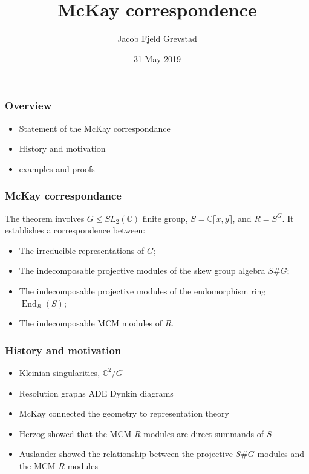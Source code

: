 \documentclass[screen, aspectratio=43]{beamer}
\title{McKay correspondence}
\author[J. F. Grevstad]{Jacob Fjeld Grevstad}
\institute[NTNU]{Department of Mathematical sciences, NTNU}
\date{31 May 2019}
\theoremstyle{definition}
\newcommand{\C}{\mathbb{C}}
\DeclareMathOperator{\End}{End}
\begin{document}
\begin{frame}
  \titlepage
\end{frame}


\begin{frame}
	\frametitle{Overview}
	\begin{itemize}
		\item Statement of the McKay correspondance
		\item History and motivation
		\item examples and proofs
	\end{itemize}
\end{frame}

\begin{frame}
	\frametitle{McKay correspondance}
	The theorem involves $G \leq SL_2(\C)$ finite group, $S= \C \llbracket x, y \rrbracket$, and $R = S^G$. It establishes a correspondence between:
	\begin{itemize}
		\item The irreducible representations of $G$; 
		\item The indecomposable projective modules of the skew group algebra $S\#G$;
		\item The indecomposable projective modules of the endomorphism ring $\End_R(S)$;
		\item The indecomposable MCM modules of $R$.
	\end{itemize}
\end{frame}

\begin{frame}
	\frametitle{History and motivation}
	\begin{itemize}
		\item Kleinian singularities, $\C^2 / G$
		\item Resolution graphs ADE Dynkin diagrams 
		\item McKay connected the geometry to representation theory
		\item Herzog showed that the MCM $R$-modules are direct summands of $S$
		\item Auslander showed the relationship between the projective $S\#G$-modules and the MCM $R$-modules
	\end{itemize}
\end{frame}
\end{document}
